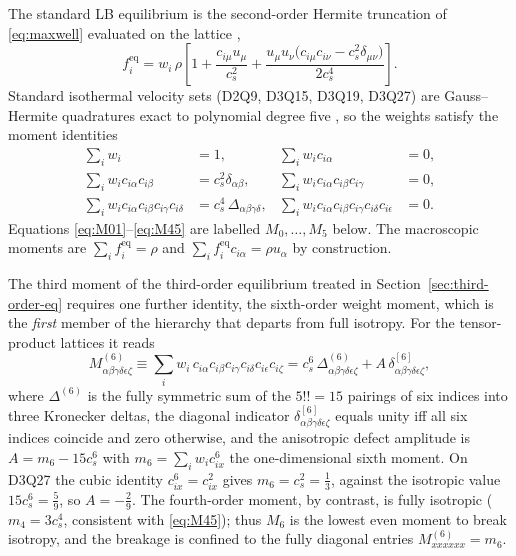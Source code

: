 \documentclass[preprint,11pt]{elsarticle}
\newcommand{\cs}{c_s}
\newcommand{\eq}{\mathrm{eq}}
\newcommand{\Deltafour}{\Delta_{\alpha\beta\gamma\delta}}
\newcommand{\sumi}{\sum_i}
\begin{document}
The standard LB equilibrium is the second-order Hermite truncation of
\eqref{eq:maxwell} evaluated on the lattice
\citep{Qian1992,HeLuo1997,ShanYuanChen2006},
\begin{equation}
f_i^{\eq}
= w_i\,\rho\left[
1
+\frac{c_{i\mu}u_\mu}{\cs^{2}}
+\frac{u_\mu u_\nu\big(c_{i\mu}c_{i\nu}-\cs^{2}\delta_{\mu\nu}\big)}{2\cs^{4}}
\right].
\label{eq:feq2}
\end{equation}
Standard isothermal velocity sets (D2Q9, D3Q15, D3Q19, D3Q27) are
Gauss--Hermite quadratures exact to polynomial degree five
\citep{HeLuo1997,ShanYuanChen2006}, so the weights satisfy the moment
identities
\begin{subequations}
\label{eq:lattice}
\begin{align}
\sumi w_i &= 1, &
\sumi w_i c_{i\alpha} &= 0,
\label{eq:M01}\\
\sumi w_i c_{i\alpha}c_{i\beta} &= \cs^{2}\delta_{\alpha\beta},  &
\sumi w_i c_{i\alpha}c_{i\beta}c_{i\gamma} &= 0,
\label{eq:M23}\\
\sumi w_i c_{i\alpha}c_{i\beta}c_{i\gamma}c_{i\delta}
&= \cs^{4}\,\Deltafour, &
\sumi w_i c_{i\alpha}c_{i\beta}c_{i\gamma}c_{i\delta}c_{i\epsilon} &= 0.
\label{eq:M45}
\end{align}
\end{subequations}
Equations \eqref{eq:M01}--\eqref{eq:M45} are labelled $M_0,\dots,M_5$ below.
The macroscopic moments are $\sum_i f_i^{\eq}=\rho$ and
$\sum_i f_i^{\eq}c_{i\alpha}=\rho u_\alpha$ by construction.

The third moment of the third-order equilibrium treated in
Section~\ref{sec:third-order-eq} requires one further identity, the sixth-order
weight moment, which is the \emph{first} member of the hierarchy that departs
from full isotropy. For the tensor-product lattices it reads
\begin{equation}
M^{(6)}_{\alpha\beta\gamma\delta\epsilon\zeta}
\equiv\sumi w_i\,c_{i\alpha}c_{i\beta}c_{i\gamma}c_{i\delta}c_{i\epsilon}c_{i\zeta}
=\cs^{6}\,\Delta^{(6)}_{\alpha\beta\gamma\delta\epsilon\zeta}
+A\,\delta^{[6]}_{\alpha\beta\gamma\delta\epsilon\zeta},
\label{eq:M6}
\end{equation}
where $\Delta^{(6)}$ is the fully symmetric sum of the $5!!=15$ pairings of six
indices into three Kronecker deltas, the diagonal indicator
$\delta^{[6]}_{\alpha\beta\gamma\delta\epsilon\zeta}$ equals unity iff all six
indices coincide and zero otherwise, and the anisotropic defect amplitude is
$A=m_6-15\cs^{6}$ with $m_6=\sumi w_i c_{ix}^{6}$ the one-dimensional sixth
moment. On D3Q27 the cubic identity $c_{ix}^{6}=c_{ix}^{2}$ gives
$m_6=\cs^{2}=\tfrac13$, against the isotropic value $15\cs^{6}=\tfrac59$, so
$A=-\tfrac29$. The fourth-order moment, by contrast, is fully isotropic
($m_4=3\cs^{4}$, consistent with \eqref{eq:M45}); thus $M_6$ is the lowest even
moment to break isotropy, and the breakage is confined to the fully diagonal
entries $M^{(6)}_{xxxxxx}=m_6$.
\end{document}
